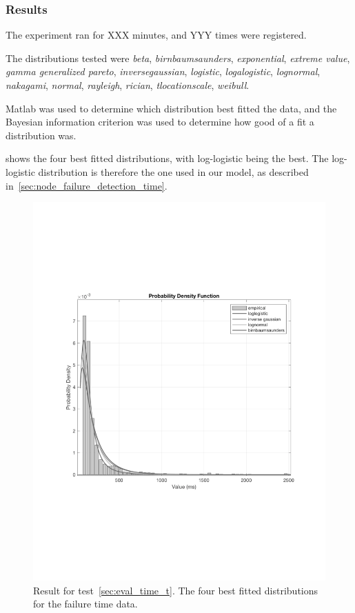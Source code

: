 \documentclass{cslthse-msc}
\begin{document}
\subsubsection*{Results}
The experiment ran for XXX minutes, and YYY times were registered.

The distributions tested were \emph{beta}, \emph{birnbaumsaunders}, \emph{exponential}, \emph{extreme value}, \emph{gamma generalized pareto}, \emph{inversegaussian}, \emph{logistic}, \emph{logalogistic}, \emph{lognormal}, \emph{nakagami}, \emph{normal}, \emph{rayleigh}, \emph{rician}, \emph{tlocationscale}, \emph{weibull}.

Matlab was used to determine which distribution best fitted the data, and the Bayesian information criterion was used to determine how good of a fit a distribution was.

 shows the four best fitted distributions, with log-logistic being the best. The log-logistic distribution is therefore the one used in our model, as described in~\cref{sec:node_failure_detection_time}.


\begin{figure}[!hbt]
\centering
\includegraphics[scale=0.5]{images/results/distribution_results.pdf} 
\caption{Result for test~\ref{sec:eval_time_t}. The four best fitted distributions for the failure time data.}\label{fig:distribution_results}
\end{figure} 
\end{document}

